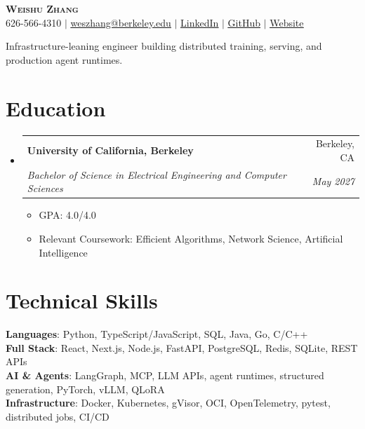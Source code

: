 \documentclass[letterpaper,10pt]{article}
\makeatletter
\newcommand{\resumeItem}[1]{
  \item\small{{#1 \vspace{-3pt}}}
}
\newcommand{\resumeSubheading}[4]{
  \vspace{-3pt}\item
    \begin{tabular*}{0.97\textwidth}[t]{l@{\extracolsep{\fill}}r}
      \textbf{#1} & #2 \\
      \textit{\small#3} & \textit{\small #4} \\
    \end{tabular*}\vspace{-7pt}
}
\newcommand{\resumeSubHeadingListStart}{
  \begin{itemize}[leftmargin=0.15in, label={}]
}
\newcommand{\resumeSubHeadingListEnd}{
  \end{itemize}
}
\newcommand{\resumeItemListStart}{
  \begin{itemize}[leftmargin=0.2in, topsep=1pt, itemsep=1pt]
}
\newcommand{\resumeItemListEnd}{
  \end{itemize}\vspace{-7pt}
}
\makeatother
\begin{document}

\begin{center}
  \textbf{\Huge \scshape Weishu Zhang} \\ \vspace{3pt}
  \small
  626-566-4310 $|$
  \href{mailto:weszhang@berkeley.edu}
  {\underline{weszhang@berkeley.edu}} $|$
  \href{https://linkedin.com/in/Weishuz}
  {\underline{LinkedIn}} $|$
  \href{https://github.com/WeishuZ}
  {\underline{GitHub}} $|$
  \href{https://weishuz.com/}
  {\underline{Website}}
\end{center}

\vspace{-6pt}

\begin{center}
  \small
  Infrastructure-leaning engineer building distributed training,
  serving, and production agent runtimes.
\end{center}


\section{Education}

\resumeSubHeadingListStart

  \resumeSubheading
    {University of California, Berkeley}{Berkeley, CA}
    {Bachelor of Science in Electrical Engineering and Computer Sciences}
    {May 2027}

    \resumeItemListStart
      \resumeItem{GPA: 4.0/4.0}
      \resumeItem{
        Relevant Coursework:
        Efficient Algorithms, Network Science, Artificial Intelligence
      }
    \resumeItemListEnd

\resumeSubHeadingListEnd


\section{Technical Skills}

\begin{itemize}[leftmargin=0.15in, label={}]
  \small{
    \item{
      \textbf{Languages}{:
        Python, TypeScript/JavaScript, SQL, Java, Go, C/C++
      } \\

      \textbf{Full Stack}{:
        React, Next.js, Node.js, FastAPI, PostgreSQL, Redis, SQLite,
        REST APIs
      } \\

      \textbf{AI \& Agents}{:
        LangGraph, MCP, LLM APIs, agent runtimes, structured generation,
        PyTorch, vLLM, QLoRA
      } \\

      \textbf{Infrastructure}{:
        Docker, Kubernetes, gVisor, OCI, OpenTelemetry, pytest,
        distributed jobs, CI/CD
      }
    }
  }
\end{itemize}
\end{document}
